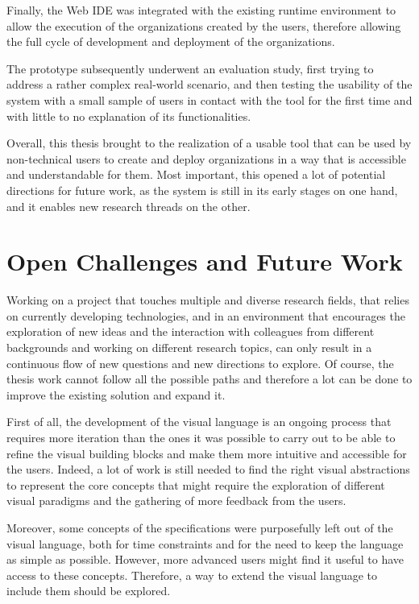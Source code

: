 Finally, the Web IDE was integrated with the existing runtime environment to allow the execution of the organizations created by the users, therefore allowing the full cycle of development and deployment of the organizations.

The prototype subsequently underwent an evaluation study, first trying to address a rather complex real-world scenario, and then testing the usability of the system with a small sample of users in contact with the tool for the first time and with little to no explanation of its functionalities.

Overall, this thesis brought to the realization of a usable tool that can be used by non-technical users to create and deploy organizations in a way that is accessible and understandable for them.
Most important, this opened a lot of potential directions for future work, as the system is still in its early stages on one hand, and it enables new research threads on the other.

\section*{Open Challenges and Future Work}
Working on a project that touches multiple and diverse research fields, that relies on currently developing technologies, and in an environment that encourages the exploration of new ideas and the interaction with colleagues from different backgrounds and working on different research topics, can only result in a continuous flow of new questions and new directions to explore.
Of course, the thesis work cannot follow all the possible paths and therefore a lot can be done to improve the existing solution and expand it.

First of all, the development of the visual language is an ongoing process that requires more iteration than the ones it was possible to carry out to be able to refine the visual building blocks and make them more intuitive and accessible for the users.
Indeed, a lot of work is still needed to find the right visual abstractions to represent the core concepts that might require the exploration of different visual paradigms and the gathering of more feedback from the users.

Moreover, some concepts of the \moise{} specifications were purposefully left out of the visual language, both for time constraints and for the need to keep the language as simple as possible.
However, more advanced users might find it useful to have access to these concepts.
Therefore, a way to extend the visual language to include them should be explored.

